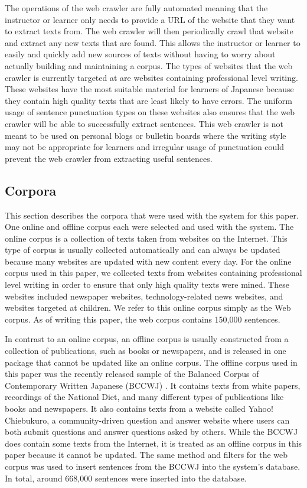 \documentclass[english]{jnlp_1.4}
\begin{document}
The operations of the web crawler are fully automated meaning that the instructor or learner only needs to provide a URL of the website that they want to extract texts from. The web crawler will then periodically crawl that website and extract any new texts that are found. This allows the instructor or learner to easily and quickly add new sources of texts without having to worry about actually building and maintaining a corpus. The types of websites that the web crawler is currently targeted at are websites containing professional level writing. These websites have the most suitable material for learners of Japanese because they contain high quality texts that are least likely to have errors. The uniform usage of sentence punctuation types on these websites also ensures that the web crawler will be able to successfully extract sentences. This web crawler is not meant to be used on personal blogs or bulletin boards where the writing style may not be appropriate for learners and irregular usage of punctuation could prevent the web crawler from extracting useful sentences.


\subsection{Corpora}

This section describes the corpora that were used with the system for this paper. One online and offline corpus each were selected and used with the system. The online corpus is a collection of texts taken from websites on the Internet. This type of corpus is usually collected automatically and can always be updated because many websites are updated with new content every day. For the online corpus used in this paper, we collected texts from websites containing professional level writing in order to ensure that only high quality texts were mined. These websites included newspaper websites, technology-related news websites, and websites targeted at children. We refer to this online corpus simply as the Web corpus. As of writing this paper, the web corpus contains 150,000 sentences.

In contrast to an online corpus, an offline corpus is usually constructed from a collection of publications, such as books or newspapers, and is released in one package that cannot be updated like an online corpus. The offline corpus used in this paper was the recently released sample of the Balanced Corpus of Contemporary Written Japanese (BCCWJ) \cite{Book_BCCWJ}. It contains texts from white papers, recordings of the National Diet, and many different types of publications like books and newspapers. It also contains texts from a website called Yahoo! Chiebukuro, a community-driven question and answer website where users can both submit questions and answer questions asked by others. While the BCCWJ does contain some texts from the Internet, it is treated as an offline corpus in this paper because it cannot be updated. The same method and filters for the web corpus was used to insert sentences from the BCCWJ into the system's database. In total, around 668,000 sentences were inserted into the database.
\end{document}
